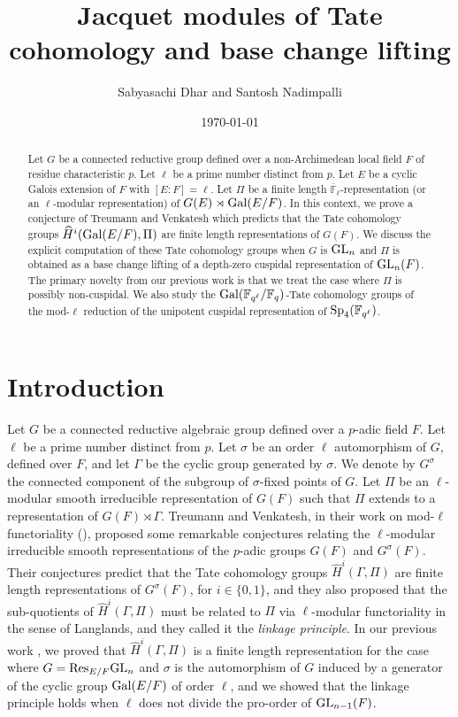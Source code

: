 \documentclass[10pt, reqno]{amsart}
\title{Jacquet modules of Tate cohomology and base change lifting}
\author{Sabyasachi Dhar and Santosh Nadimpalli} \date{\today}
\theoremstyle{plain}
\numberwithin{equation}{section} \newcommand{\di}{\operatorname{dim}}
\begin{document}
\maketitle
\begin{abstract}
  Let $G$ be a connected reductive group defined over a
  non-Archimedean local field $F$ of residue characteristic $p$. Let
  $\ell$ be a prime number distinct from $p$. Let $E$ be a cyclic
  Galois extension of $F$ with $[E:F]=\ell$.  Let $\Pi$ be a finite
  length $\overline{\mathbb{F}}_\ell$-representation (or an
  $\ell$-modular representation) of $G(E)\rtimes {\rm Gal}(E/F)$.  In
  this context, we prove a conjecture of Treumann and Venkatesh which
  predicts that the Tate cohomology groups
  $\widehat{H}^i({\rm Gal}(E/F), \Pi)$ are finite length
  representations of $G(F)$.  We discuss the explicit computation of
  these Tate cohomology groups when $G$ is ${\rm GL}_n$ and $\Pi$ is
  obtained as a base change lifting of a depth-zero cuspidal
  representation of ${\rm GL}_n(F)$. The primary novelty from our
  previous work is that we treat the case where $\Pi$ is possibly
  non-cuspidal.  We also study the
  ${\rm Gal}(\mathbb{F}_{q^\ell}/\mathbb{F}_q)$-Tate cohomology groups
  of the mod-$\ell$ reduction of the unipotent cuspidal representation
  of ${\rm Sp}_4(\mathbb{F}_{q^\ell})$.
\end{abstract}
\section{Introduction}
Let $G$ be a connected reductive algebraic group defined over a
$p$-adic field $F$. Let $\ell$ be a prime number distinct from $p$.
Let $\sigma$ be an order $\ell$ automorphism of $G$, defined over $F$,
and let $\Gamma$ be the cyclic group generated by $\sigma$.  We denote
by $G^\sigma$ the connected component of the subgroup of
$\sigma$-fixed points of $G$.  Let $\Pi$ be an $\ell$-modular smooth
irreducible representation of $G(F)$ such that $\Pi$ extends to a
representation of $G(F)\rtimes\Gamma$. Treumann and Venkatesh, in
their work on mod-$\ell$ functoriality (\cite[Conjectures
6.3]{Treumann_Venkatesh_linkage}), proposed some remarkable
conjectures relating the $\ell$-modular irreducible smooth
representations of the $p$-adic groups $G(F)$ and $G^\sigma(F)$. Their
conjectures predict that the Tate cohomology groups
$\widehat{H}^i(\Gamma, \Pi)$ are finite length representations of
$G^\sigma(F)$, for $i\in \{0,1\}$, and they also proposed that the
sub-quotients of $\widehat{H}^i(\Gamma, \Pi)$ must be related to $\Pi$
via $\ell$-modular functoriality in the sense of Langlands, and they
called it the {\it linkage principle}. In our previous work
\cite{nadimpalli2024tate}, we proved that $\widehat{H}^i(\Gamma, \Pi)$
is a finite length representation for the case where
$G={\rm Res}_{E/F}{\rm GL}_n$ and $\sigma$ is the automorphism of $G$
induced by a generator of the cyclic group ${\rm Gal}(E/F)$ of order
$\ell$, and we showed that the linkage principle holds when $\ell$
does not divide the pro-order of ${\rm GL}_{n-1}(F)$.
\end{document}
